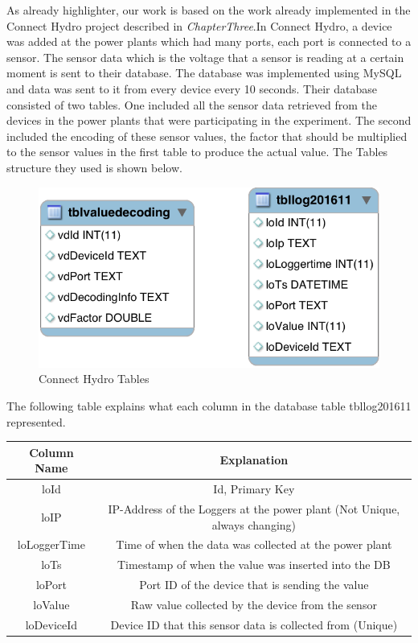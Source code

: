As already highlighter, our work is based on the work already implemented in the Connect Hydro project described in \textit{ChapterThree}.In Connect Hydro, a device was added at the power plants which had many ports, each port is connected to a sensor. The sensor data which is the voltage that a sensor is reading at a certain moment is sent to their database. The database was implemented using MySQL and data was sent to it from every device every 10 seconds. Their database consisted of two tables. One included all the sensor data retrieved from the devices in the power plants that were participating in the experiment. The second included the encoding of these sensor values, the factor that should be multiplied to the sensor values in the first table to produce the actual value. The Tables structure they used is shown below.
\begin{figure}[H]
\centering
\includegraphics[scale=0.4]{Images/LoggingDatabase.png}
\caption[Connect Hydro Tables]{Connect Hydro Tables}
\end{figure}
The following table explains what each column in the database table tbllog201611 represented.
\begin{center}
\begin{tabular}{ |c|c| } 
 \hline
 Column Name & Explanation\\ [0.5ex] 
 \hline\hline
loId & Id, Primary Key\\ 
\hline
loIP & IP-Address of the Loggers at the power plant (Not Unique, always changing)\\ 
\hline
loLoggerTime & Time of when the data was collected at the power plant\\ 
\hline
loTs & Timestamp of when the value was inserted into the DB\\ 
\hline
loPort & Port ID of the device that is sending the value\\ 
\hline
loValue & Raw value collected by the device from the sensor\\
\hline
loDeviceId & Device ID that this sensor data is collected from (Unique)\\
 \hline
\end{tabular}
\end{center}
